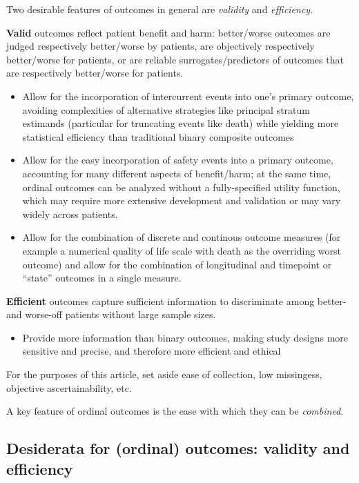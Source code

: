 \documentclass[
  11pt,
  fleqn
]{article}
\begin{document}
Two desirable features of outcomes in general are \emph{validity} and
\emph{efficiency}.

\textbf{Valid} outcomes reflect
patient benefit and harm: better/worse outcomes are judged respectively
better/worse by patients, are objectively respectively better/worse for
patients, or are reliable surrogates/predictors of outcomes that are
respectively better/worse for patients.

\begin{itemize}
  \item Allow for the incorporation of intercurrent events into one's primary
    outcome, avoiding complexities of alternative strategies like
    principal stratum
    estimands (particular for truncating events like death) while yielding more
    statistical efficiency than traditional binary composite outcomes

  \item Allow for the easy incorporation of safety events into a
    primary outcome, accounting for many different aspects
    of benefit/harm; at the same time, ordinal outcomes can be
    analyzed without a
    fully-specified utility function, which may require more
    extensive development and validation or may vary widely across patients.

  \item Allow for the combination of discrete and continous outcome
    measures (for
      example a numerical quality of life scale with death as the
      overriding worst
    outcome) and allow for the combination of longitudinal and timepoint or
    ``state'' outcomes in a single measure.
\end{itemize}

\textbf{Efficient} outcomes
capture sufficient information to discriminate among better- and worse-off
patients without large sample sizes.

\begin{itemize}
  \item Provide more information than binary outcomes, making study
    designs more sensitive and precise, and
    therefore more efficient and ethical
\end{itemize}

For the purposes of this
article, set aside ease of collection, low missingess, objective
ascertainability, etc.

A key feature of ordinal outcomes is the ease with which they can be
\emph{combined}.

\subsection{Desiderata for (ordinal) outcomes: validity and efficiency}
\end{document}
